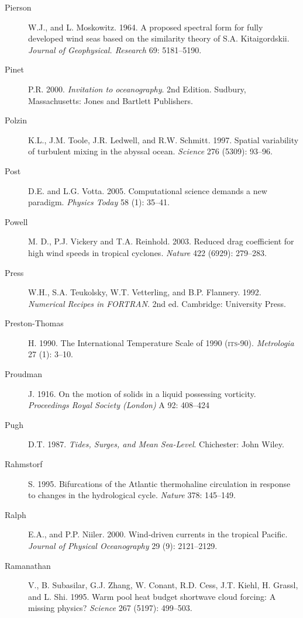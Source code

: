 \begin{description}
\item [Pierson]W.J., and L. Moskowitz. 1964. A proposed spectral form
  for fully developed wind seas based on the similarity theory of
  S.A. Kitaigordskii.  \textit{Journal of Geophysical. Research} 69:
  5181--5190.

\item [Pinet]P.R. 2000. \textit{Invitation to oceanography}. 2nd
  Edition.  Sudbury, Massachusetts: Jones and Bartlett Publishers.

\item [Polzin]K.L., J.M. Toole, J.R. Ledwell, and
  R.W. Schmitt. 1997. Spatial variability of turbulent mixing in the
  abyssal ocean. \textit{Science} 276 (5309): 93--96.

\item[Post]D.E. and L.G. Votta. 2005. Computational science demands a
  new paradigm. \textit{Physics Today} 58 (1): 35--41.

\item [Powell]M. D., P.J. Vickery and T.A. Reinhold. 2003. Reduced
  drag coefficient for high wind speeds in tropical
  cyclones. \textit{Nature} 422 (6929): 279--283.

\item [Press]W.H., S.A. Teukolsky, W.T. Vetterling, and
  B.P. Flannery. 1992.  \textit{Numerical Recipes in FORTRAN}. 2nd ed.
  Cambridge: University Press.

\item [Preston-Thomas]H. 1990. The International Temperature Scale of
  1990 (\textsc{its}-90). \textit{Metrologia} 27 (1): 3--10.

\item [Proudman]J. 1916. On the motion of solids in a liquid
  possessing vorticity. \textit{Proceedings Royal Society (London)} A
  92: 408--424

\item [Pugh]D.T. 1987. \textit{Tides, Surges, and Mean Sea-Level}.
  Chichester: John Wiley.

\item [Rahmstorf]S. 1995. Bifurcations of the Atlantic thermohaline
  circulation in response to changes in the hydrological
  cycle. \textit{Nature} 378: 145--149.

\item [Ralph]E.A., and P.P. Niiler. 2000. Wind-driven currents in the
  tropical Pacific. \textit{Journal of Physical Oceanography} 29 (9):
  2121--2129.

\item [Ramanathan]V., B. Subasilar, G.J. Zhang, W. Conant, R.D. Cess,
  J.T. Kiehl, H. Grassl, and L. Shi. 1995. Warm pool heat budget
  shortwave cloud forcing: A missing physics? \textit{Science} 267
  (5197): 499--503.


\end{description}
